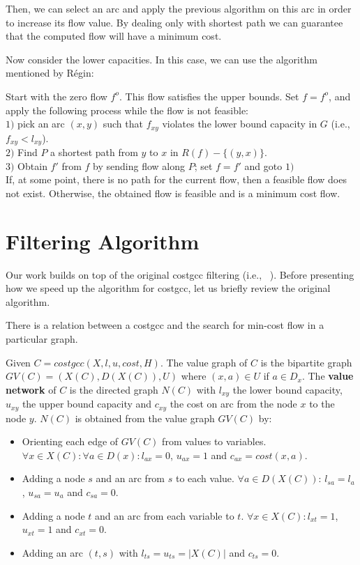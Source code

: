Then, we can select an arc and apply the previous algorithm on this arc in order to increase its flow value.
By dealing only with shortest path we can guarantee that the computed flow will have a minimum cost. 

Now consider the lower capacities. In this case, we can use the algorithm mentioned by Régin:

Start with the zero flow $f^o$. This flow satisfies the upper bounds.
Set $f=f^o$, and apply the following process while the flow is not feasible:\\
$1)$ pick an arc $(x, y)$ such that $f_{xy}$ violates the lower bound capacity in
$G$ (i.e., $f_{xy} < l_{xy}$).\\
$2)$ Find $P$ a shortest path from
$y$ to $x$ in $R(f)-\{(y, x)\}$.\\ 
$3)$ Obtain $f'$ from  $f$ by sending flow along $P$; set
$f=f'$ and goto $1)$\\
If, at some point, there is no
path for the current flow, then a feasible flow does not
exist. Otherwise, the obtained flow is feasible and is a minimum cost flow.

\section{Filtering Algorithm}
\label{sec:FilteringAlgorithm}
Our work builds on top of the original costgcc filtering (i.e., ~\cite{Regin:CostbasedArcConsistencyforGlobalCardinalityConstraints}). Before presenting how we speed up the algorithm for costgcc, let us briefly review the original algorithm.

There is a relation between a costgcc and the search for min-cost flow in a particular graph.

    \begin{definition}
        Given $C = costgcc(X, l, u, cost, H)$. The value graph of $C$ is the bipartite graph $GV(C) = (X(C), D(X(C)), U)$ where $(x, a) \in U
        $ if $a \in D_x$. 
        The {\bf value network} of $C$ is the directed graph $N(C)$ with $l_{xy}$ the lower bound capacity, $u_{xy}$ the upper bound capacity and $c_{xy}$ the cost on arc from the node $x$ to the node $y$. $N(C)$ is obtained from the value graph $GV(C)$ by:
        \begin{itemize}
            \item Orienting each edge of $GV(C)$ from values to variables. $\forall x \in X(C) : \forall a \in D(x): l_{ax} =0$, $u_{ax} =1$ and $c_{ax} =cost(x,a)$.
            \item Adding a node $s$ and an arc from $s$ to each value. $\forall a \in D(X(C))$: $l_{sa} = l_a$, $u_{sa} = u_a$ and $c_{sa} =0$.
            \item Adding a node $t$ and an arc from each variable to $t$. $\forall x \in X(C): l_{xt} =1$, $u_{xt} =1$ and $c_{xt} =0$.
            \item Adding an arc $(t, s)$ with $l_{ts} \!\! = u_{ts} \!\! = \!\! |X(C)|$ and $c_{ts} \!\! = \!\! 0$.
        \end{itemize}
    \end{definition}

